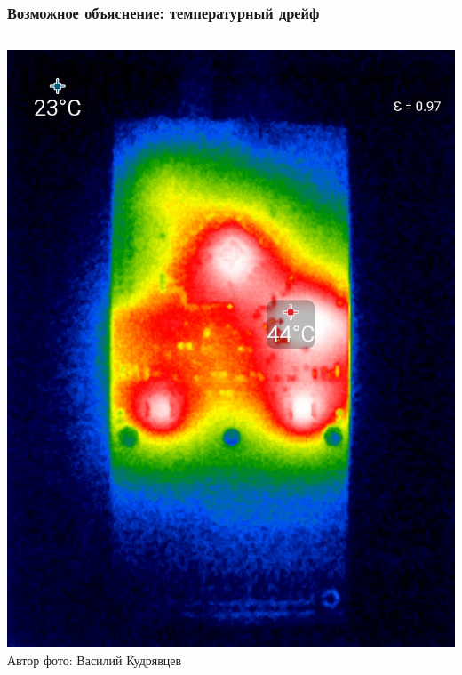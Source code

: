 \documentclass[14pt]{beamer}
\begin{document}
\begin{frame}[c]
\frametitle{Возможное объяснение: температурный дрейф}
\vspace{10pt}
\begin{columns}
	\begin{minipage}[t][1\textheight]{\linewidth}
		\centering\includegraphics[width=0.8\linewidth]{Thermal_image.jpg}
		\newline \tiny{Автор фото: Василий Кудрявцев}
	\end{minipage}%
	\begin{minipage}[t][1\textheight]{\linewidth}

\end{minipage}
\end{columns}
\end{frame}
\end{document}
